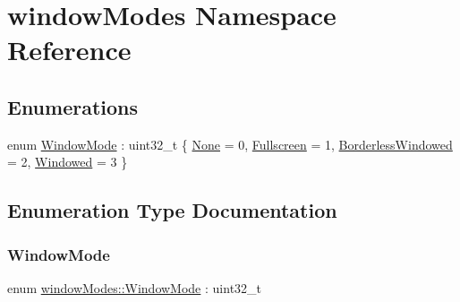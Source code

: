 \hypertarget{namespacewindow_modes}{}\section{window\+Modes Namespace Reference}
\label{namespacewindow_modes}
\subsection*{Enumerations}
\begin{DoxyCompactItemize}
\item 
enum \hyperlink{namespacewindow_modes_ad00676c38b0aa6cac2c15a7d3a8748e4}{Window\+Mode} \+: uint32\+\_\+t \{ \hyperlink{namespacewindow_modes_ad00676c38b0aa6cac2c15a7d3a8748e4a38394653a7af68e866ed90d8859f16b3}{None} = 0, 
\hyperlink{namespacewindow_modes_ad00676c38b0aa6cac2c15a7d3a8748e4abd29fcb1241ef5704a0ce54bfaa41a87}{Fullscreen} = 1, 
\hyperlink{namespacewindow_modes_ad00676c38b0aa6cac2c15a7d3a8748e4ad867a1d84bd6938a48a36855e8775fc0}{Borderless\+Windowed} = 2, 
\hyperlink{namespacewindow_modes_ad00676c38b0aa6cac2c15a7d3a8748e4a223bf2b3ccc8a7f297ff9be571dfb2c4}{Windowed} = 3
 \}
\end{DoxyCompactItemize}


\subsection{Enumeration Type Documentation}
\mbox{\label{namespacewindow_modes_ad00676c38b0aa6cac2c15a7d3a8748e4}} 
\subsubsection{\texorpdfstring{Window\+Mode}{WindowMode}}
{\footnotesize\ttfamily enum \hyperlink{namespacewindow_modes_ad00676c38b0aa6cac2c15a7d3a8748e4}{window\+Modes\+::\+Window\+Mode} \+: uint32\+\_\+t}


